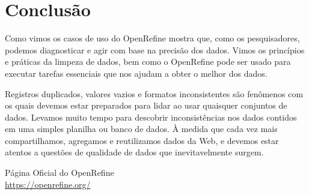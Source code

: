 \documentclass[a4paper,11pt]{article}
\begin{document}
\section{Conclusão}
Como vimos os casos de uso do OpenRefine mostra que, como os pesquisadores, podemos diagnosticar e agir com base na precisão dos dados. Vimos os princípios e práticas da limpeza de dados, bem como o OpenRefine pode ser usado para executar tarefas essenciais que nos ajudam a obter o melhor dos dados.

Registros duplicados, valores vazios e formatos inconsistentes são fenômenos com os quais devemos estar preparados para lidar ao usar quaisquer conjuntos de dados. Levamos muito tempo para descobrir inconsistências nos dados contidos em uma simples planilha ou banco de dados. À medida que cada vez mais compartilhamos, agregamos e reutilizamos dados da Web, e devemos estar atentos a questões de qualidade de dados que inevitavelmente surgem.



\begin{thebibliography}{4}
  Página Oficial do OpenRefine \\
  \url{https://openrefine.org/}
  
  
\end{thebibliography}
  
\end{document}
